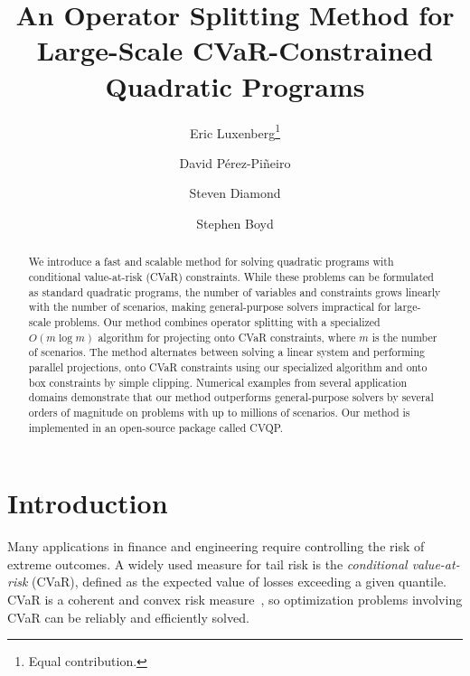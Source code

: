 \documentclass[12pt]{article}
\begin{document}
\title{An Operator Splitting Method for Large-Scale CVaR-Constrained Quadratic Programs}

\author[1]{Eric Luxenberg\footnote{Equal contribution.}}
\newcommand\CoAuthorMark{\footnotemark[\arabic{footnote}]} %
\author[1,2]{David Pérez-Piñeiro\protect\CoAuthorMark}
\author[1]{Steven Diamond}
\author[1]{Stephen Boyd}


\maketitle

\begin{abstract} 
We introduce a fast and scalable method for solving quadratic programs with
conditional value-at-risk (CVaR) constraints. While these problems can be
formulated as standard quadratic programs, the number of variables and
constraints grows linearly with the number of scenarios, making general-purpose
solvers impractical for large-scale problems. Our method combines operator
splitting with a specialized $O(m\log m)$ algorithm for projecting onto CVaR
constraints, where $m$ is the number of scenarios. The method alternates between
solving a linear system and performing parallel projections, onto CVaR
constraints using our specialized algorithm and onto box constraints by
simple clipping. Numerical examples from several application domains
demonstrate that our method outperforms general-purpose solvers by several
orders of magnitude on problems with up to millions of scenarios. Our method is
implemented in an open-source package called CVQP.
\end{abstract}

\clearpage
\tableofcontents
\clearpage

\section{Introduction}
Many applications in finance and engineering require controlling the risk
of extreme outcomes. A widely used measure for tail risk is the
\emph{conditional value-at-risk} (CVaR), defined as the expected value of
losses exceeding a given quantile. CVaR is a coherent and convex risk
measure~\cite{rockafellar2000optimization}, so optimization
problems involving CVaR can be reliably and efficiently solved.
\end{document}
